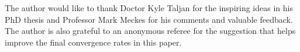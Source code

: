 \documentclass[11pt]{article}
\numberwithin{equation}{section}%
\numberwithin{theorem}{section}
\begin{document}
\bigskip
{}The author would like to thank Doctor Kyle Taljan for the inspiring ideas in his PhD thesis and Professor Mark Meckes for his comments and valuable feedback. The author is also grateful to an anonymous referee for the suggestion that helps improve the final convergence rates in this paper.

\newpage





\end{document}
